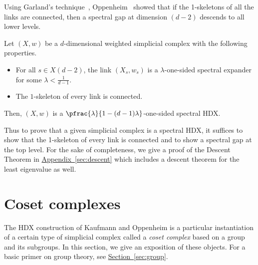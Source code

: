 \documentclass[11pt]{article}
\newcommand{\expref}[2]{\texorpdfstring{\hyperref[#2]{#1~\ref{#2}}}{#1~\ref{#2}}}
\begin{document}
Using Garland's technique~\cite{Garland1973}, Oppenheim~\cite{Oppenheim2018} 
showed that if the 1-skeletons of all the links are
connected, then a spectral gap at dimension $(d-2)$ descends to all
lower levels. 

%
\begin{dtheorem}[Oppenheim, 2018]\label{thm:trickle-down} %
%
%
%
Let $(X,w)$ be  %
a $d$-dimensional weighted simplicial complex with the following properties.
  \begin{itemize}
  \item For all $s \in X(d-2)$, the link $(X_s,w_s)$ is a
    $\lambda$-one-sided spectral expander for some $\lambda < \frac{1}{d-1}$. 
  \item The $1$-skeleton of every link is connected.
  \end{itemize}
  Then, $(X,w)$ is a $\pfrac{\lambda}{1 - (d-1)\lambda}$-one-sided spectral HDX.
\end{dtheorem}
Thus to prove that a given simplicial complex is a spectral HDX, it suffices to show that the 1-skeleton of %
every link is %
connected and %
to show   %
a spectral gap at the top level.
For the sake of completeness, we give a proof of the 
%
Descent Theorem  %
in
%
\expref{Appendix}{sec:descent}  %
which includes a descent theorem for the least eigenvalue as well.


\section{Coset complexes}

The HDX construction of Kaufmann and Oppenheim is a particular instantiation of a certain type of simplicial complex called a \emph{coset complex} based on a group and its subgroups. In this section, we give an exposition of these objects. 
For a basic primer on group theory,
see \expref{Section}{sec:group}.  %
%
\end{document}
